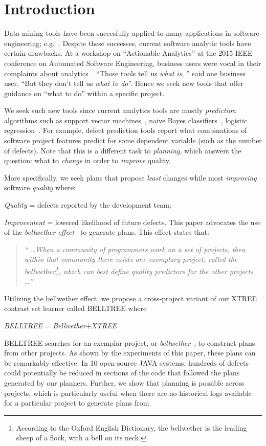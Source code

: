 \newpage
\section{Introduction}
Data mining tools have been succesfully applied to many applications in software engineering; e.g.~\citep{czer11, ostrand04, Menzies2007a, turhan11, koc11b, export:208800, theisen15}. 
Despite these successes,  current
software analytic tools have certain drawbacks. At a workshop on ``Actionable Analytics'' at the 2015 IEEE conference on
Automated Software Engineering, 
business users were vocal in their complaints about analytics~\citep{hihn15}.
``Those tools tell us \textit{what is}, '' said one business user, ``But they don't tell us \textit{what to do}''.
Hence we seek new tools that offer  guidance on ``what to do'' within a specific project. 

We seek such new tools since  current   analytics tools are mostly \textit{prediction} algorithms such as support vector machines~\citep{cortes95}, naive Bayes classifiers~\citep{lessmann08}, logistic regression~\citep{lessmann08}. For example, defect prediction tools report what combinations of software project features predict for some dependent variable (such as the number of defects). Note that this is a different task to \textit{planning}, which answers the question: what to {\em change} in order to {\em improve} quality.
	
More specifically, we seek plans that propose {\em least} changes while most \textit{improving} software \textit{quality} where:
\bi
\item \textit{Quality} = defects reported by the development team; 
\item \textit{Improvement} = lowered likelihood of future defects.
\ei
This paper advocates the use of the {\em bellwether effect}~\citep{krishna16, krishna17a, mensah2018investigating} to generate plans. This effect states that:
\begin{quote}
  \textit{`` \ldots When a community of programmers work on a set of projects, then within that community there exists one exemplary project, called the bellwether\footnote{According to the Oxford English Dictionary, the bellwether is the leading sheep of a flock, with a bell on its neck.}, which can best define quality predictors for the other projects \ldots ''}
\end{quote}
Utilizing the bellwether effect, we propose a cross-project variant of our XTREE contrast set learner called BELLTREE where
\begin{center}
  \textit{BELLTREE} = \textit{Bellwether}$+$\textit{XTREE}
\end{center}
BELLTREE searches for an exemplar project, or \textit{bellwether}~\citep{krishna17a}, to construct plans from other projects. As shown by
the experiments of this paper, these plans can be remarkably effective. In 10 open-source JAVA systems, hundreds of defects could potentially be reduced in sections of the code that followed the plans generated by our planners. Further, we show that planning is possible across projects, which is particularly useful when there are no historical logs available for a particular project to generate plans from.

